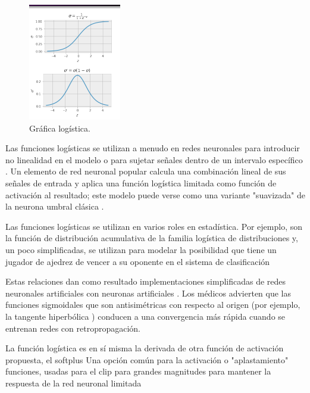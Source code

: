 \begin{figure}[h]
 \centering
 \includegraphics[scale=0.8]{../Figuras/logistica.png}
 \caption{Gráfica logística.}
 \label{fig:graficaLog}
\end{figure}

Las funciones logísticas se utilizan a menudo en redes neuronales para introducir no linealidad en el modelo o para sujetar señales dentro de un intervalo específico . Un elemento de red neuronal popular calcula una combinación lineal de sus señales de entrada y aplica una función logística limitada como función de activación al resultado; este modelo puede verse como una variante "suavizada" de la neurona umbral clásica .

Las funciones logísticas se utilizan en varios roles en estadística. Por ejemplo, son la función de distribución acumulativa de la familia logística de distribuciones y, un poco simplificadas, se utilizan para modelar la posibilidad que tiene un jugador de ajedrez de vencer a su oponente en el sistema de clasificación 

Estas relaciones dan como resultado implementaciones simplificadas de redes neuronales artificiales con neuronas artificiales . Los médicos advierten que las funciones sigmoidales que son antisimétricas con respecto al origen (por ejemplo, la tangente hiperbólica ) conducen a una convergencia más rápida cuando se entrenan redes con retropropagación.

La función logística es en sí misma la derivada de otra función de activación propuesta, el softplus 
Una opción común para la activación o "aplastamiento" funciones, usadas para el clip para grandes magnitudes para mantener la respuesta de la red neuronal limitada 
